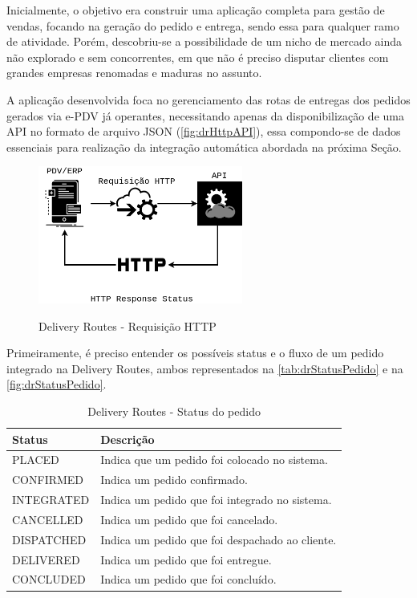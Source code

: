 Inicialmente, o objetivo era construir uma aplicação completa para gestão de vendas, focando na geração do pedido e entrega, sendo essa para qualquer ramo de atividade. Porém, descobriu-se a possibilidade de um nicho de mercado ainda não explorado e sem concorrentes, em que não é preciso disputar clientes com grandes empresas renomadas e maduras no assunto.
 
A aplicação desenvolvida foca no gerenciamento das rotas de entregas dos pedidos gerados via e-PDV já operantes, necessitando apenas da disponibilização de uma API no formato de arquivo JSON (\autoref{fig:drHttpAPI}), essa compondo-se de dados essenciais para realização da integração automática abordada na próxima Seção.
 
  \begin{figure}[H]
    \centering
    \caption{Delivery Routes - Requisição HTTP}
    \includegraphics[width=0.6\textwidth]{./dados/figuras/fig16}
    \label{fig:drHttpAPI}
\end{figure}

Primeiramente, é preciso entender os possíveis status e o fluxo de um pedido integrado na Delivery Routes, ambos representados na \autoref{tab:drStatusPedido} e na \autoref{fig:drStatusPedido}.
 
 \begin{table}[H]
    \centering
    \caption{Delivery Routes - Status do pedido
    \label{tab:drStatusPedido}}
\begin{tabular}{|l|l|}
\hline
\textbf{Status} & \textbf{Descrição} \\ \hline
PLACED & Indica que um pedido foi colocado no sistema. \\ \hline
CONFIRMED & Indica um pedido confirmado. \\ \hline
INTEGRATED & Indica um pedido que foi integrado no sistema. \\ \hline
CANCELLED & Indica um pedido que foi cancelado. \\ \hline
DISPATCHED & Indica um pedido que foi despachado ao cliente. \\ \hline
DELIVERED & Indica um pedido que foi entregue. \\ \hline
CONCLUDED & Indica um pedido que foi concluído. \\ \hline
\end{tabular}
\end{table}
 
